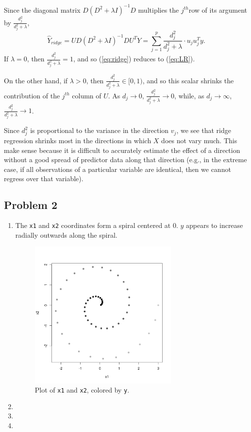 \documentclass[12pt]{article}
\newcommand{\inv}{^{-1}}                            %
\renewcommand{\hat}{\widehat}
\begin{document}
Since the diagonal matrix $D (D^2 + \lambda I)\inv D$ multiplies the
$j^{th}$row of its argument by $\frac{d_j^2}{d_j^2 + \lambda}$,
\begin{equation}
\hat Y_{ridge}
    = U D (D^2 + \lambda I)\inv D U^T Y
    = \sum_{j = 1}^p \frac{d_j^2}{d_j^2 + \lambda} \cdot u_j u_j^T y.
\label{eq:ridge}
\end{equation}
If $\lambda = 0$, then $\frac{d_j^2}{d_j^2 + \lambda} = 1$, and so
(\ref{eq:ridge}) reduces to (\ref{eq:LR}).

On the other hand, if $\lambda > 0$, then
$\frac{d_j^2}{d_j^2 + \lambda} \in [0,1)$, and so this scalar shrinks the
contribution of the $j^{th}$ column of $U$. As $d_j \to 0$,
$\frac{d_j^2}{d_j^2 + \lambda} \to 0$, while, as $d_j \to \infty$,
$\frac{d_j^2}{d_j^2 + \lambda} \to 1$.

Since $d_j^2$ is proportional to the variance in the direction $v_j$, we see
that ridge regression shrinks most in the directions in which $X$ does not vary
much. This make sense because it is difficult to accurately estimate the effect
of a direction without a good spread of predictor data along that direction
(e.g., in the extreme case, if all observations of a particular variable are
identical, then we cannot regress over that variable).

\subsection*{Problem 2}
\begin{enumerate}
\item The \texttt{x1} and \texttt{x2} coordinates form a spiral centered at
$0$. $y$ appears to increase radially outwards along the spiral.
\begin{figure}[ht]
\centering
\includegraphics[width=0.7\textwidth]{2a}
\caption{Plot of \texttt{x1} and \texttt{x2}, colored by \texttt{y}.}
\label{fig:2a}
\end{figure}

\item 
\item 
\item 
\end{enumerate}
\end{document}
